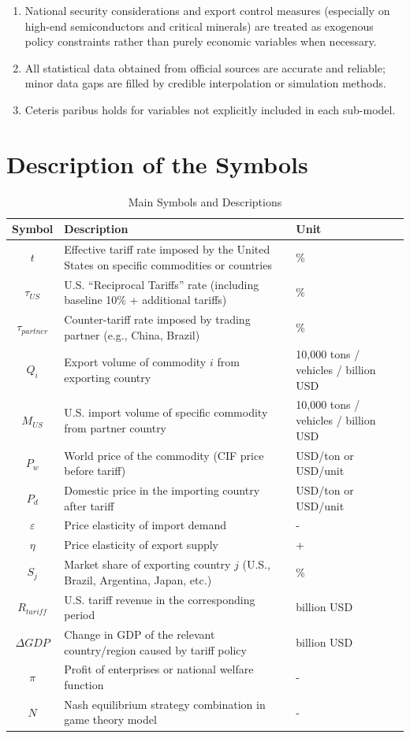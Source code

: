 \documentclass{apmcmthesis}
\begin{document}
\begin{enumerate}
    \item National security considerations and export control measures (especially on high-end semiconductors and critical minerals) are treated as exogenous policy constraints rather than purely economic variables when necessary.
    \item All statistical data obtained from official sources are accurate and reliable; minor data gaps are filled by credible interpolation or simulation methods.
    \item Ceteris paribus holds for variables not explicitly included in each sub-model.
\end{enumerate}

\section{Description of the Symbols}\label{sec:symbols}

\begin{table}[H]
\centering
\caption{Main Symbols and Descriptions}
\begin{tabular}{c >{\raggedright\arraybackslash}p{8.5cm} l}
\hline
\textbf{Symbol} & \textbf{Description} & \textbf{Unit} \\
\hline
$t$ & Effective tariff rate imposed by the United States on specific commodities or countries & \% \\
$\tau_{US}$ & U.S. ``Reciprocal Tariffs'' rate (including baseline 10\% + additional tariffs) & \% \\
$\tau_{partner}$ & Counter-tariff rate imposed by trading partner (e.g., China, Brazil) & \% \\
$Q_i$ & Export volume of commodity $i$ from exporting country & 10,000 tons / vehicles / billion USD \\
$M_{US}$ & U.S. import volume of specific commodity from partner country & 10,000 tons / vehicles / billion USD \\
$P_w$ & World price of the commodity (CIF price before tariff) & USD/ton or USD/unit \\
$P_d$ & Domestic price in the importing country after tariff & USD/ton or USD/unit \\
$\varepsilon$ & Price elasticity of import demand & - \\
$\eta$ & Price elasticity of export supply & + \\
$S_j$ & Market share of exporting country $j$ (U.S., Brazil, Argentina, Japan, etc.) & \% \\[0.2em]
$R_{tariff}$ & U.S. tariff revenue in the corresponding period & billion USD \\
$\Delta GDP$ & Change in GDP of the relevant country/region caused by tariff policy & billion USD \\
$\pi$ & Profit of enterprises or national welfare function & - \\
$N$ & Nash equilibrium strategy combination in game theory model & - \\
\hline
\end{tabular}
\label{tab:symbols}
\end{table}
\end{document}
